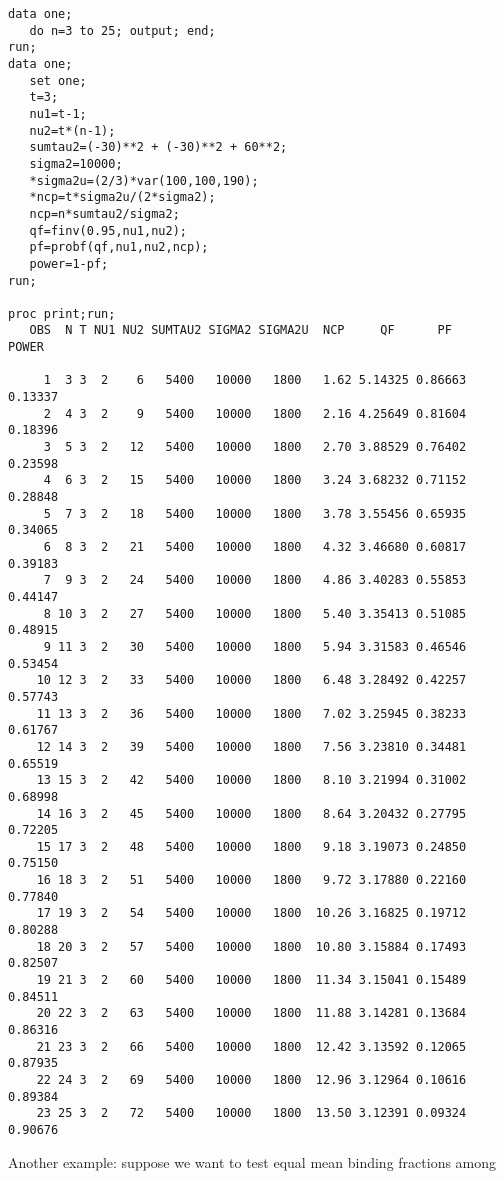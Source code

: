 \begin{large}
\begin{verbatim}
data one;
   do n=3 to 25; output; end;
run;
data one;
   set one;
   t=3;
   nu1=t-1;
   nu2=t*(n-1);
   sumtau2=(-30)**2 + (-30)**2 + 60**2;
   sigma2=10000;
   *sigma2u=(2/3)*var(100,100,190);
   *ncp=t*sigma2u/(2*sigma2);
   ncp=n*sumtau2/sigma2;
   qf=finv(0.95,nu1,nu2);
   pf=probf(qf,nu1,nu2,ncp);
   power=1-pf;
run;

proc print;run;
   OBS  N T NU1 NU2 SUMTAU2 SIGMA2 SIGMA2U  NCP     QF      PF    POWER

     1  3 3  2    6   5400   10000   1800   1.62 5.14325 0.86663 0.13337
     2  4 3  2    9   5400   10000   1800   2.16 4.25649 0.81604 0.18396
     3  5 3  2   12   5400   10000   1800   2.70 3.88529 0.76402 0.23598
     4  6 3  2   15   5400   10000   1800   3.24 3.68232 0.71152 0.28848
     5  7 3  2   18   5400   10000   1800   3.78 3.55456 0.65935 0.34065
     6  8 3  2   21   5400   10000   1800   4.32 3.46680 0.60817 0.39183
     7  9 3  2   24   5400   10000   1800   4.86 3.40283 0.55853 0.44147
     8 10 3  2   27   5400   10000   1800   5.40 3.35413 0.51085 0.48915
     9 11 3  2   30   5400   10000   1800   5.94 3.31583 0.46546 0.53454
    10 12 3  2   33   5400   10000   1800   6.48 3.28492 0.42257 0.57743
    11 13 3  2   36   5400   10000   1800   7.02 3.25945 0.38233 0.61767
    12 14 3  2   39   5400   10000   1800   7.56 3.23810 0.34481 0.65519
    13 15 3  2   42   5400   10000   1800   8.10 3.21994 0.31002 0.68998
    14 16 3  2   45   5400   10000   1800   8.64 3.20432 0.27795 0.72205
    15 17 3  2   48   5400   10000   1800   9.18 3.19073 0.24850 0.75150
    16 18 3  2   51   5400   10000   1800   9.72 3.17880 0.22160 0.77840
    17 19 3  2   54   5400   10000   1800  10.26 3.16825 0.19712 0.80288
    18 20 3  2   57   5400   10000   1800  10.80 3.15884 0.17493 0.82507
    19 21 3  2   60   5400   10000   1800  11.34 3.15041 0.15489 0.84511
    20 22 3  2   63   5400   10000   1800  11.88 3.14281 0.13684 0.86316
    21 23 3  2   66   5400   10000   1800  12.42 3.13592 0.12065 0.87935
    22 24 3  2   69   5400   10000   1800  12.96 3.12964 0.10616 0.89384
    23 25 3  2   72   5400   10000   1800  13.50 3.12391 0.09324 0.90676
\end{verbatim}
\end{large}
\newpage
\noindent
Another example: suppose we want to test equal mean binding fractions among
